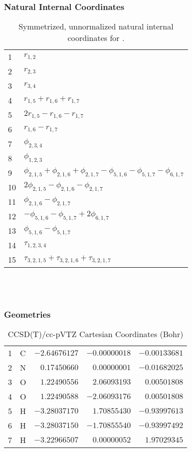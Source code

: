 \documentclass[10pt,oneside]{article}
\begin{document}
\clearpage

\subsubsection*{Natural Internal Coordinates}
\begin{table}[h!]
\centering
\caption{Symmetrized, unnormalized natural internal coordinates for .}
\small
\begin{tabular}{ll}
  1   & $r_{1,2}$ \\
  2   & $r_{2,3}$ \\
  3   & $r_{3,4}$ \\
  4   & $r_{1,5} + r_{1,6} + r_{1,7}$ \\
  5   & $2r_{1,5} - r_{1,6} - r_{1,7}$ \\
  6   & $r_{1,6} - r_{1,7}$ \\
  7   & $\phi_{2,3,4}$ \\
  8   & $\phi_{1,2,3}$ \\
  9   & $\phi_{2,1,5} + \phi_{2,1,6} + \phi_{2,1,7} - \phi_{5,1,6} - \phi_{5,1,7} - \phi_{6,1,7}$ \\
  10  & $2\phi_{2,1,5} - \phi_{2,1,6} - \phi_{2,1,7}$ \\
  11  & $\phi_{2,1,6} - \phi_{2,1,7}$ \\
  12  & $-\phi_{5,1,6} - \phi_{5,1,7} + 2\phi_{6,1,7}$ \\
  13  & $\phi_{5,1,6} - \phi_{5,1,7}$ \\
  14  & $\tau_{1,2,3,4}$ \\
  15  & $\tau_{3,2,1,5} + \tau_{3,2,1,6} + \tau_{3,2,1,7}$ \\
\end{tabular}
\end{table}

\clearpage

\subsection{\ \ \ }

\subsubsection*{Geometries}
\begin{table}[h!]
\centering
\caption{CCSD(T)/cc-pVTZ Cartesian Coordinates (Bohr)}
\begin{tabular}{llrrr}
1  & C  & $-2.64676127$ & $-0.00000018$ & $-0.00133681$ \\
2  & N  & $ 0.17450660$ & $ 0.00000001$ & $-0.01682025$ \\
3  & O  & $ 1.22490556$ & $ 2.06093193$ & $ 0.00501808$ \\
4  & O  & $ 1.22490588$ & $-2.06093176$ & $ 0.00501808$ \\
5  & H  & $-3.28037170$ & $ 1.70855430$ & $-0.93997613$ \\
6  & H  & $-3.28037150$ & $-1.70855540$ & $-0.93997492$ \\
7  & H  & $-3.22966507$ & $ 0.00000052$ & $ 1.97029345$ \\
\end{tabular}
\end{table}
\end{document}
